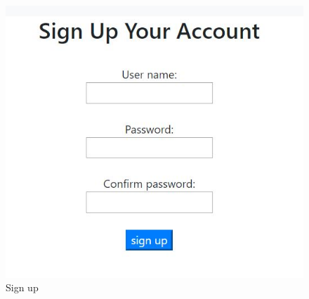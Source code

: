 \documentclass[12pt]{article}
\begin{document}
	\begin{figure}[H]
		\centering
		\includegraphics[scale=0.6]{register}
		\caption{Sign up}
	\end{figure}
	
	
	
\end{document}

